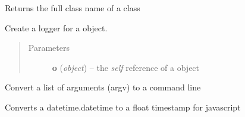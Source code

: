 \documentclass[letterpaper,10pt,english]{sphinxmanual}
\begin{document}

\begin{fulllineitems}
\label{ambrosia.util:ambrosia.util.classname}
Returns the full class name of a class

\end{fulllineitems}


\begin{fulllineitems}
\label{ambrosia.util:ambrosia.util.get_class}
\end{fulllineitems}


\begin{fulllineitems}
\label{ambrosia.util:ambrosia.util.get_logger}
Create a logger for a object.
\begin{quote}\begin{description}
\item[{Parameters}] \leavevmode
\textbf{o} (\emph{object}) -- the \emph{self} reference of a object

\end{description}\end{quote}

\end{fulllineitems}


\begin{fulllineitems}
\label{ambrosia.util:ambrosia.util.join_command}
Convert a list of arguments (argv) to a command line

\end{fulllineitems}


\begin{fulllineitems}
\label{ambrosia.util:ambrosia.util.js_date}
Converts a datetime.datetime to a float timestamp for javascript

\end{fulllineitems}
\end{document}
